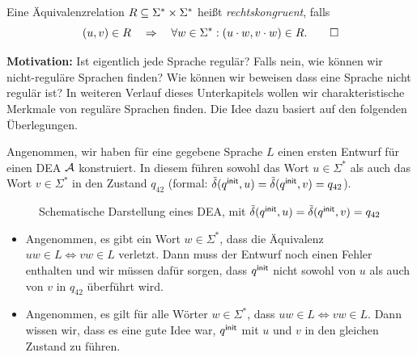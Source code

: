 \begin{Def}[name={[Rechtskongruente Äquivalenzrelation]}]
        Eine Äquivalenzrelation $R\subseteq\Sigma^*\times\Sigma^*$ heißt \emph{rechtskongruent}, falls
        \[
        (u,v)\in R \quad\=>\quad \forall w\in\Sigma^*: (u\cdot w,v\cdot w) \in R.
        \qedhere
        \]
\end{Def}




\textbf{Motivation:}
Ist eigentlich jede Sprache regulär? 
Falls nein, wie können wir nicht-reguläre Sprachen finden?
Wie können wir beweisen dass eine Sprache nicht regulär ist?
In weiteren Verlauf dieses Unterkapitels wollen wir charakteristische Merkmale von reguläre Sprachen finden.
Die Idee dazu basiert auf den folgenden Überlegungen.

Angenommen, wir haben für eine gegebene Sprache $L$ einen ersten
Entwurf für einen \ac{DEA} $\mathcal{A}$ konstruiert.
In diesem führen sowohl das Wort $u\in\Sigma^*$
als auch das Wort $v\in\Sigma^*$ in den Zustand $q_{42}$ (formal: $\tilde\delta(q^\mathsf{init}, u) = \tilde\delta(q^\mathsf{init}, v) = q_{42}$).
\begin{figure}[H]\centering
	\caption{Schematische Darstellung eines \ac{DEA}, mit $\tilde\delta(q^\mathsf{init}, u) = \tilde\delta(q^\mathsf{init}, v) = q_{42}$}
\end{figure}
\begin{itemize}
 \item Angenommen, es gibt ein Wort $w\in\Sigma^*$, dass die Äquivalenz $uw\in L \Leftrightarrow vw\in L$ verletzt.
 Dann muss der Entwurf noch einen Fehler enthalten und wir müssen dafür sorgen, 
 dass $q^\mathsf{init}$ nicht sowohl von $u$ als auch von $v$ in $q_{42}$ überführt wird.
 \item Angenommen, es gilt für alle Wörter $w\in\Sigma^*$, dass $uw\in L\Leftrightarrow vw\in L$.
 Dann wissen wir, dass es eine gute Idee war, $q^\mathsf{init}$ mit $u$ und $v$ in den gleichen Zustand zu führen.
\end{itemize}
